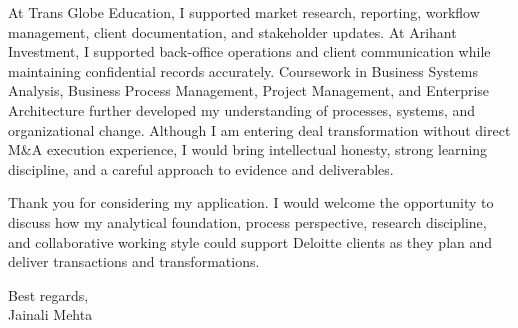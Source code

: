 \documentclass[letterpaper,11pt]{article}
\begin{document}
\bigbreak
At Trans Globe Education, I supported market research, reporting, workflow management, client documentation, and stakeholder updates. At Arihant Investment, I supported back-office operations and client communication while maintaining confidential records accurately. Coursework in Business Systems Analysis, Business Process Management, Project Management, and Enterprise Architecture further developed my understanding of processes, systems, and organizational change. Although I am entering deal transformation without direct M\&A execution experience, I would bring intellectual honesty, strong learning discipline, and a careful approach to evidence and deliverables.

\bigbreak
Thank you for considering my application. I would welcome the opportunity to discuss how my analytical foundation, process perspective, research discipline, and collaborative working style could support Deloitte clients as they plan and deliver transactions and transformations.

\bigbreak
Best regards,\\
Jainali Mehta
\end{document}
